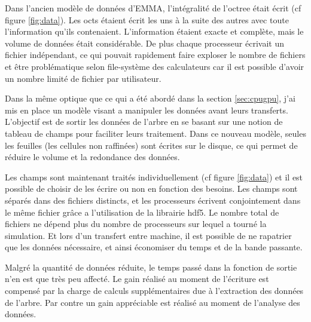 
Dans l'ancien modèle de données d'EMMA, l'intégralité de l'octree était écrit (cf figure \ref{fig:data}).
Les octs étaient écrit les uns à la suite des autres avec toute l'information qu'ils contenaient.
L'information étaient exacte et complète, mais le volume de données était considérable.
De plus chaque processeur écrivait un fichier indépendant, ce qui pouvait rapidement faire exploser le nombre de fichiers et être problématique selon file-système des calculateurs car il est possible d'avoir un nombre limité de fichier par utilisateur.

Dans la même optique que ce qui a été abordé dans la section \ref{sec:cpugpu}, j'ai mis en place un modèle visant a manipuler les données avant leurs transferts.
L'objectif est de sortir les données de l'arbre en se basant sur une notion de tableau de champs pour faciliter leurs traitement.
Dans ce nouveau modèle, seules les feuilles (les cellules non raffinées) sont écrites sur le disque, ce qui permet de réduire le volume et la redondance des données.

Les champs sont maintenant traités individuellement (cf figure \ref{fig:data}) et il est possible de choisir de les écrire ou non en fonction des besoins.
Les champs sont séparés dans des fichiers distincts, et les processeurs écrivent conjointement dans le même fichier grâce a l'utilisation de la librairie hdf5.
Le nombre total de fichiers ne dépend plus du nombre de processeurs sur lequel a tourné la simulation.
Et lors d'un transfert entre machine, il est possible de ne rapatrier que les données nécessaire, et ainsi économiser du temps et de la bande passante.

Malgré la quantité de données réduite, le temps passé dans la fonction de sortie n'en est que très peu affecté.
Le gain réalisé au moment de l'écriture est compensé par la charge de calculs supplémentaires due à l'extraction des données de l'arbre.
Par contre un gain appréciable est réalisé au moment de l'analyse des données.

